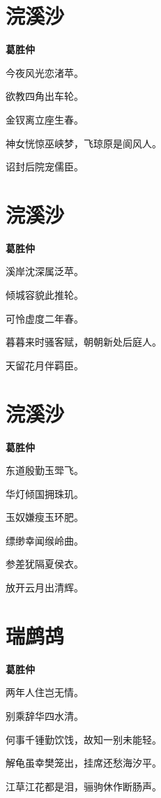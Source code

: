 \documentclass[12pt,a4paper]{ctexbook}
\begin{document}
\section{浣溪沙}
\textbf{葛胜仲}\par\vspace{0.5em}
今夜风光恋渚苹。\par
欲教四角出车轮。\par
金钗离立座生春。\par
神女恍惊巫峡梦，飞琼原是阆风人。\par
诏封后院宠儒臣。\par

\section{浣溪沙}
\textbf{葛胜仲}\par\vspace{0.5em}
溪岸沈深属泛苹。\par
倾城容貌此推轮。\par
可怜虚度二年春。\par
暮暮来时骚客赋，朝朝新处后庭人。\par
天留花月伴羁臣。\par

\section{浣溪沙}
\textbf{葛胜仲}\par\vspace{0.5em}
东道殷勤玉斝飞。\par
华灯倾国拥珠玑。\par
玉奴嫌瘦玉环肥。\par
缥缈幸闻缑岭曲。\par
参差犹隔夏侯衣。\par
放开云月出清辉。\par

\section{瑞鹧鸪}
\textbf{葛胜仲}\par\vspace{0.5em}
两年人住岂无情。\par
别乘辞华四水清。\par
何事千锺勤饮饯，故知一别未能轻。\par
解龟虽幸樊笼出，挂席还愁海汐平。\par
江草江花都是泪，骊驹休作断肠声。\par
\end{document}
